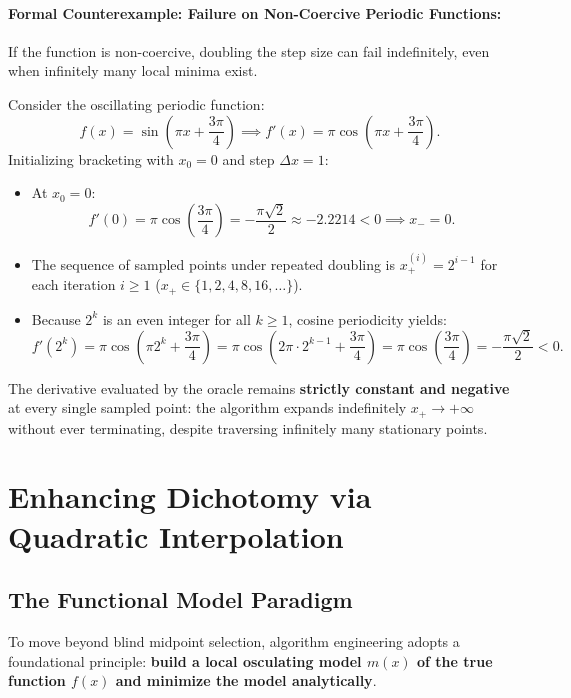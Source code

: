 \paragraph{Formal Counterexample: Failure on Non-Coercive Periodic Functions:}
If the function is non-coercive, doubling the step size can fail indefinitely, even when infinitely many local minima exist.
\begin{example}
Consider the oscillating periodic function:
\begin{equation}
    f(x) = \sin\left(\pi x + \frac{3\pi}{4}\right) \implies f'(x) = \pi \cos\left(\pi x + \frac{3\pi}{4}\right).
    \label{eq:counterexample-periodic-function-en}
\end{equation}
Initializing bracketing with $x_0 = 0$ and step $\Delta x = 1$:
\begin{itemize}
    \item At $x_0 = 0$:
    \begin{equation}
        f'(0) = \pi \cos\left(\frac{3\pi}{4}\right) = -\frac{\pi \sqrt{2}}{2} \approx -2.2214 < 0 \implies x_- = 0.
    \end{equation}
    \item The sequence of sampled points under repeated doubling is $x_+^{(i)} = 2^{i-1}$ for each iteration $i \ge 1$ ($x_+ \in \{1, 2, 4, 8, 16, \dots\}$).
    \item Because $2^k$ is an even integer for all $k \ge 1$, cosine periodicity yields:
    \begin{equation}
        f'(2^k) = \pi \cos\left(\pi 2^k + \frac{3\pi}{4}\right) = \pi \cos\left(2\pi \cdot 2^{k-1} + \frac{3\pi}{4}\right) = \pi \cos\left(\frac{3\pi}{4}\right) = -\frac{\pi \sqrt{2}}{2} < 0.
    \end{equation}
\end{itemize}
The derivative evaluated by the oracle remains \textbf{strictly constant and negative} at every single sampled point: the algorithm expands indefinitely $x_+ \to +\infty$ without ever terminating, despite traversing infinitely many stationary points.
\end{example}

\FloatBarrier
\section{Enhancing Dichotomy via Quadratic Interpolation}
\label{sec:univariate-quadratic-interpolation-en}

\subsection{The Functional Model Paradigm}
To move beyond blind midpoint selection, algorithm engineering adopts a foundational principle: \textbf{build a local osculating model $m(x)$ of the true function $f(x)$ and minimize the model analytically}.

